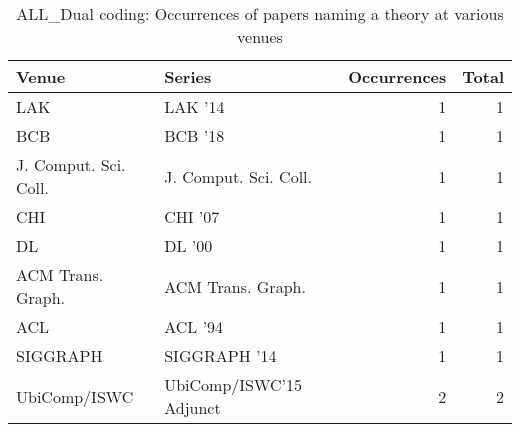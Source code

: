 \begin{table*}[t]
\begin{tabular}{llrr}
Venue & Series & Occurrences & Total\\\hline
\multirow{1}{*}{LAK } & LAK '14 & 1 & \multirow{1}{*}{1}\\
\multirow{1}{*}{BCB } & BCB '18 & 1 & \multirow{1}{*}{1}\\
\multirow{1}{*}{J. Comput. Sci. Coll.} & J. Comput. Sci. Coll. & 1 & \multirow{1}{*}{1}\\
\multirow{1}{*}{CHI } & CHI '07 & 1 & \multirow{1}{*}{1}\\
\multirow{1}{*}{DL } & DL '00 & 1 & \multirow{1}{*}{1}\\
\multirow{1}{*}{ACM Trans. Graph.} & ACM Trans. Graph. & 1 & \multirow{1}{*}{1}\\
\multirow{1}{*}{ACL } & ACL '94 & 1 & \multirow{1}{*}{1}\\
\multirow{1}{*}{SIGGRAPH } & SIGGRAPH '14 & 1 & \multirow{1}{*}{1}\\
\multirow{1}{*}{UbiComp/ISWC} & UbiComp/ISWC'15 Adjunct & 2 & \multirow{1}{*}{2}\\
\end{tabular}
\caption{ALL\_Dual coding: Occurrences of papers naming a theory at various venues}
\end{table*}